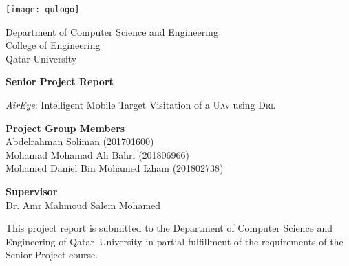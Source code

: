 \documentclass[../main.tex]{subfiles}
\begin{document}
        \thispagestyle{empty}

        \centering
        \texttt{[image: qulogo]}

        \Large
        Department of Computer Science and Engineering\\
        College of Engineering\\
        Qatar University\\

        \vspace{2.5cm}

        \Huge
        \textbf{Senior Project Report}

        \vspace{1.1cm}
        \Large
        \emph{AirEye}: Intelligent Mobile Target Visitation of a \textsc{Uav} using \textsc{Drl}

        \vspace{3.3cm}

        \raggedright
        \large
        \-\hspace{0.8cm} \textbf{Project Group Members}\\
        \normalsize
        \medskip
        \-\hspace{1.3cm} Abdelrahman Soliman (201701600)\\
        \-\hspace{1.3cm} Mohamad Mohamad Ali Bahri (201806966)\\
        \-\hspace{1.3cm} Mohamed Daniel Bin Mohamed Izham (201802738)\\

        \vspace{1.0cm}

        \large
        \-\hspace{0.8cm} \textbf{Supervisor}\\
        \normalsize
        \medskip
        \-\hspace{1.3cm} Dr. Amr Mahmoud Salem Mohamed\\

        \vfill

        \small

        This project report is submitted to the Department
        of Computer Science and Engineering of Qatar~University 
        in partial fulfillment of the
        requirements of the Senior Project course.

        \vspace{0.8cm}
\end{document}
